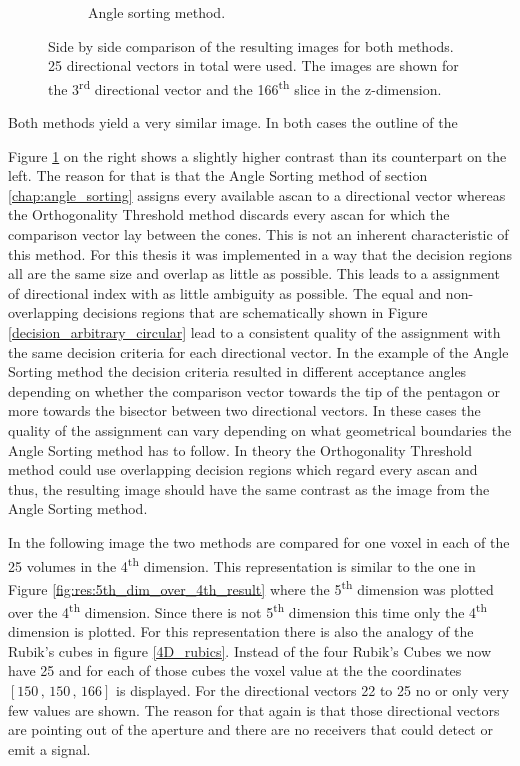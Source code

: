 \begin{figure}[H]
\begin{subfigure}[b]{0.49\textwidth}
         \caption{Angle sorting method.}
         \label{fig:res:slice_diff_bubble_ortho_imagebubble}
     \end{subfigure}
        \caption{Side by side comparison of the resulting images for both methods. 25 directional vectors in total were used. The images are shown for the 3\textsuperscript{rd} directional vector and the 166\textsuperscript{th} slice in the z-dimension.}
        \label{fig:res:slice_diff_bubble_ortho_image}
\end{figure}



Both methods yield a very similar image. In both cases the outline of the 



Figure \ref{fig:res:slice_diff_bubble_ortho_imagebubble} on the right shows a slightly higher contrast than its counterpart on the left. The reason for that is that the Angle Sorting method of section \ref{chap:angle_sorting} assigns every available \ac{ascan} to a directional vector whereas the Orthogonality Threshold method discards every \ac{ascan} for which the comparison vector lay between the cones. This is not an inherent characteristic of this method. For this thesis it was implemented in a way that the decision regions all are the same size and overlap as little as possible. This leads to a assignment of directional index with as little ambiguity as possible. The equal and non-overlapping decisions regions that are schematically shown in Figure \ref{decision_arbitrary_circular} lead to a consistent quality of the assignment with the same decision criteria for each directional vector. In the example of the Angle Sorting method the decision criteria resulted in different acceptance angles depending on whether the comparison vector towards the tip of the pentagon or more towards the bisector between two directional vectors. In these cases the quality of the assignment can vary depending on what geometrical boundaries the Angle Sorting method has to follow.  In theory the Orthogonality Threshold method could use overlapping decision regions which regard every \ac{ascan} and thus, the resulting image should have the same contrast as the image from the Angle Sorting method.

\bigskip

In the following image the two methods are compared for one voxel in each of the 25 volumes in the 4\textsuperscript{th} dimension. This representation is similar to the one in Figure \ref{fig:res:5th_dim_over_4th_result} where the 5\textsuperscript{th} dimension was plotted over the 4\textsuperscript{th} dimension. Since there is not 5\textsuperscript{th} dimension this time only the 4\textsuperscript{th} dimension is plotted. For this representation there is also the analogy of the Rubik's cubes in figure \ref{4D_rubics}. Instead of the four Rubik's Cubes we now have 25 and for each of those cubes the voxel value at the the coordinates $[150\, , \, 150\, , \, 166]$ is displayed. For the directional vectors 22 to 25 no or only very few values are shown. The reason for that again is that those directional vectors are pointing out of the aperture and there are no receivers that could detect or emit a signal. 


